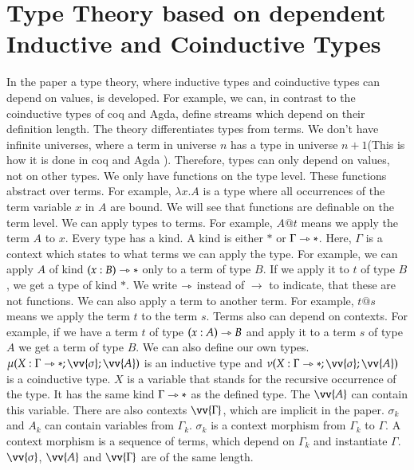 \documentclass[a4paper,cleardoubleempty,BCOR1cm]{scrbook}
\begin{document}
\chapter{Type Theory based on dependent Inductive and Coinductive Types}
\label{sec:org6ed2dce}
In the paper \cite{basold2016type} a type theory, where inductive types and
coinductive types can depend on values, is developed. For example, we can, in
contrast to the coinductive types of coq and Agda, define streams which depend
on their definition length. The theory differentiates types from terms. We
don't have infinite universes, where a term in universe \(n\) has a type in
universe \(n+1\)(This is how it is done in coq \cite{sozeau2014universe} and Agda
\cite{agdadocuniverselevels}). Therefore, types can only depend on values, not on
other types. We only have functions on the type level. These functions abstract
over terms. For example, \(\lambda x.A\) is a type where all occurrences of the
term variable \(x\) in \(A\) are bound.  We will see that functions are definable
on the term level. We can apply types to terms. For example, \(A @ t\) means we
apply the term \(A\) to \(x\). Every type has a kind. A kind is either \(*\) or
\(\Gamma\rightarrowtriangle*\). Here, \(\Gamma\) is a context which states to what terms we can
apply the type. For example, we can apply \(A\) of kind \((x:B)\rightarrowtriangle*\) only to a
term of type \(B\). If we apply it to \(t\) of type \(B\), we get a type of kind
\(*\). We write \(\rightarrowtriangle\) instead of \(\rightarrow\) to indicate, that these are not
functions. We can also apply a term to another term. For example, \(t@s\) means
we apply the term \(t\) to the term \(s\).  Terms also can depend on contexts.
For example, if we have a term \(t\) of type \((x:A)\rightarrowtriangle B\) and apply it to a term
\(s\) of type \(A\) we get a term of type \(B\).  We can also define our own types.
\(\mu(X:\Gamma\rat*;\vv{\sigma};\vv{A})\) is an inductive type and
\(\nu(X:\Gamma\rat*;\vv{\sigma};\vv{A})\) is a coinductive type. \(X\) is a
variable that stands for the recursive occurrence of the type. It has the
same kind \(\Gamma\rightarrowtriangle*\) as the defined type. The \(\vv{A}\) can contain this
variable. There are also contexts \(\vv{\Gamma}\), which are implicit in the
paper. \(\sigma_k\) and \(A_k\) can contain variables from \(\Gamma_k\). \(\sigma_k\)
is a context morphism from \(\Gamma_k\) to \(\Gamma\). A context morphism is a
sequence of terms, which depend on \(\Gamma_k\) and instantiate \(\Gamma\).
\(\vv{\sigma}\), \(\vv{A}\) and \(\vv{\Gamma}\) are of the same length.
\end{document}

